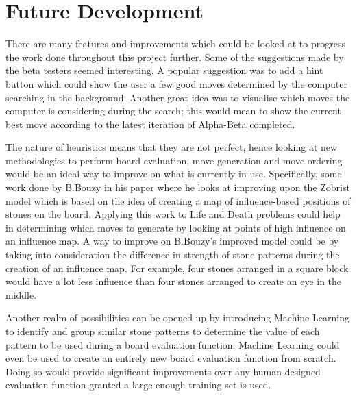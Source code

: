 \documentclass{l4proj}
\begin{document}
\section{Future Development}
There are many features and improvements which could be looked at to progress the work done throughout this project further. Some of the suggestions made by the beta testers seemed interesting. A popular suggestion was to add a hint button which could show the user a few good moves determined by the computer searching in the background. Another great idea was to visualise which moves the computer is considering during the search; this would mean to show the current best move according to the latest iteration of Alpha-Beta completed.

The nature of heuristics means that they are not perfect, hence looking at new methodologies to perform board evaluation, move generation and move ordering would be an ideal way to improve on what is currently in use. Specifically, some work done by B.Bouzy in his paper \citep{Bouzy2003} where he looks at improving upon the Zobrist model \citep{Zobrist1969} which is based on the idea of creating a map of influence-based positions of stones on the board. Applying this work to Life and Death problems could help in determining which moves to generate by looking at points of high influence on an influence map. A way to improve on B.Bouzy's improved model could be by taking into consideration the difference in strength of stone patterns during the creation of an influence map. For example, four stones arranged in a square block would have a lot less influence than four stones arranged to create an eye in the middle.

Another realm of possibilities can be opened up by introducing Machine Learning to identify and group similar stone patterns to determine the value of each pattern to be used during a board evaluation function. Machine Learning could even be used to create an entirely new board evaluation function from scratch. Doing so would provide significant improvements over any human-designed evaluation function granted a large enough training set is used.
\end{document}
